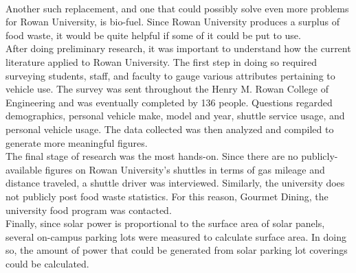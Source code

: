 \documentclass[man]{apa7}
\begin{document}
	\\
	Another such replacement, and one that could possibly solve even more problems for Rowan University, is bio-fuel. Since Rowan University produces a surplus of food waste, it would be quite helpful if some of it could be put to use. 
	\\
	After doing preliminary research, it was important to understand how the current literature applied to Rowan University. The first step in doing so required surveying students, staff, and faculty to gauge various attributes pertaining to vehicle use. The survey was sent throughout the Henry M. Rowan College of Engineering and was eventually completed by 136 people. Questions regarded demographics, personal vehicle make, model and year, shuttle service usage, and personal vehicle usage. The data collected was then analyzed and compiled to generate more meaningful figures.
	\\
	The final stage of research was the most hands-on. Since there are no publicly-available figures on Rowan University's shuttles in terms of gas mileage and distance traveled, a shuttle driver was interviewed. Similarly, the university does not publicly post food waste statistics. For this reason, Gourmet Dining, the university food program was contacted. 
	\\
	Finally, since solar power is proportional to the surface area of solar panels, several on-campus parking lots were measured to calculate surface area. In doing so, the amount of power that could be generated from solar parking lot coverings could be calculated.
	
\end{document}
